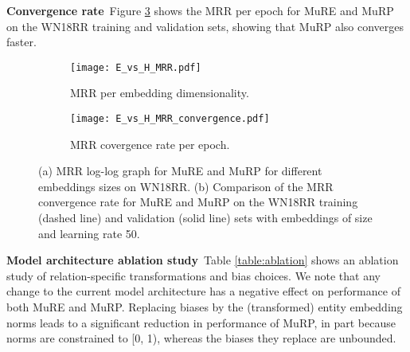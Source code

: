 \documentclass{article}
\newcommand{\keypoint}[1]{\vspace{0.cm}\noindent\textbf{#1}\,}
\begin{document}
\keypoint{Convergence rate} Figure \ref{fig:convergence} shows the MRR per epoch for MuRE and MuRP on the WN18RR training and validation sets, showing that MuRP also converges faster. 

\begin{figure}[!htb]
\centering
\begin{subfigure}[b]{0.42\textwidth}
\centering
\texttt{[image: E\_vs\_H\_MRR.pdf]}
\caption{MRR per embedding dimensionality.}
\label{fig:mrr}
\end{subfigure}
\begin{subfigure}[b]{0.42\textwidth}
\centering
\texttt{[image: E\_vs\_H\_MRR\_convergence.pdf]}
\caption{MRR covergence rate per epoch.}
\label{fig:convergence}
\end{subfigure}
\caption{(a) MRR log-log graph for MuRE and MuRP for different embeddings sizes on WN18RR. (b) Comparison of the MRR convergence rate for MuRE and MuRP on the WN18RR training (dashed line) and validation (solid line) sets with embeddings of size  and learning rate 50.}
\vspace{-0.2cm}
\end{figure}


\keypoint{Model architecture ablation study} Table \ref{table:ablation} shows an ablation study of relation-specific transformations and bias choices. We note that any change to the current model architecture has a negative effect on performance of both MuRE and MuRP. Replacing biases by the (transformed) entity embedding norms leads to a significant reduction in performance of MuRP, in part because norms are constrained to [0, 1), whereas the biases they replace are unbounded.
\end{document}
